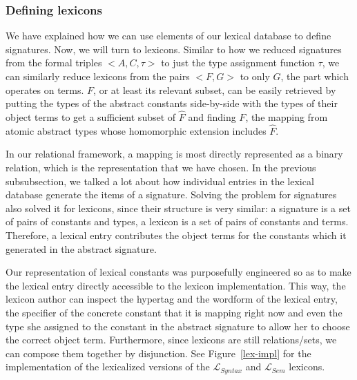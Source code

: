 \subsubsection{Defining lexicons}

We have explained how we can use elements of our lexical database to
define signatures. Now, we will turn to lexicons. Similar to how we
reduced signatures from the formal triples $\mathopen{<}A, C,
\tau\mathclose{>}$ to just the type assignment function $\tau$, we can
similarly reduce lexicons from the pairs $\mathopen{<}F, G\mathclose{>}$
to only $G$, the part which operates on terms. $F$, or at least its
relevant subset, can be easily retrieved by putting the types of the
abstract constants side-by-side with the types of their object terms to
get a sufficient subset of $\hat{F}$ and finding $F$, the mapping from
atomic abstract types whose homomorphic extension includes $\hat{F}$.

In our relational framework, a mapping is most directly represented as a
binary relation, which is the representation that we have chosen. In the
previous subsubsection, we talked a lot about how individual entries in
the lexical database generate the items of a signature. Solving the
problem for signatures also solved it for lexicons, since their
structure is very similar: a signature is a set of pairs of constants
and types, a lexicon is a set of pairs of constants and
terms. Therefore, a lexical entry contributes the object terms for the
constants which it generated in the abstract signature.

Our representation of lexical constants was purposefully engineered so
as to make the lexical entry directly accessible to the lexicon
implementation. This way, the lexicon author can inspect the hypertag
and the wordform of the lexical entry, the specifier of the concrete
constant that it is mapping right now and even the type she assigned to
the constant in the abstract signature to allow her to choose the
correct object term. Furthermore, since lexicons are still
relations/sets, we can compose them together by disjunction. See
Figure~\ref{lex-impl} for the implementation of the lexicalized versions
of the $\mathcal{L}_{Syntax}$ and $\mathcal{L}_{Sem}$ lexicons.

